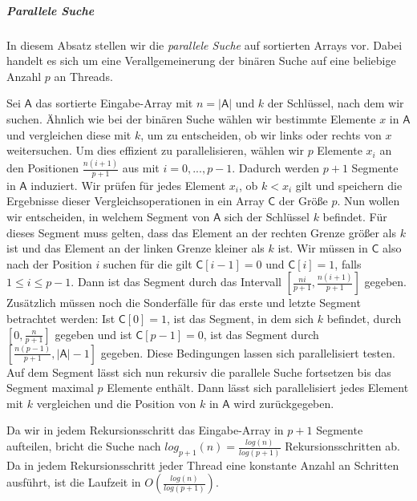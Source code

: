 \subparagraph*{Parallele Suche}
\label{dc3:parallel:suche}
In diesem Absatz stellen wir die \textit{parallele Suche} auf sortierten Arrays vor. \cite{merge:kruskal} Dabei handelt es sich um eine Verallgemeinerung der binären Suche auf eine beliebige Anzahl $p$ an Threads.

Sei $\mathsf{A}$ das sortierte Eingabe-Array mit $n = |\mathsf{A}|$ und $k$ der Schlüssel, nach dem wir suchen. Ähnlich wie bei der binären Suche wählen wir bestimmte Elemente $x$ in $\mathsf{A}$ und vergleichen diese mit $k$, um zu entscheiden, ob wir links oder rechts von $x$ weitersuchen. Um dies effizient zu parallelisieren, wählen wir $p$ Elemente $x_i$ an den Positionen $\frac{n(i+1)}{p+1}$ aus mit $i = 0,...,p-1$. Dadurch werden $p+1$ Segmente in $\mathsf{A}$ induziert. Wir prüfen für jedes Element $x_i$, ob $k < x_i$ gilt und speichern die Ergebnisse dieser Vergleichsoperationen in ein Array $\mathsf{C}$ der Größe $p$.
Nun wollen wir entscheiden, in welchem Segment von $\mathsf{A}$ sich der Schlüssel $k$ befindet. Für dieses Segment muss gelten, dass das Element an der rechten Grenze größer als $k$ ist und das Element an der linken Grenze kleiner als $k$ ist. Wir müssen in $\mathsf{C}$ also nach der Position $i$ suchen für die gilt $\mathsf{C}[i-1] = 0$ und $\mathsf{C}[i] = 1$, falls $1 \le i \le p-1$. Dann ist das Segment durch das Intervall $[\frac{ni}{p+1}, \frac{n(i+1)}{p+1}]$ gegeben. Zusätzlich müssen noch die Sonderfälle für das erste und letzte Segment betrachtet werden: Ist $\mathsf{C}[0] = 1$, ist das Segment, in dem sich $k$ befindet, durch $[0, \frac{n}{p+1}]$ gegeben und ist $\mathsf{C}[p-1] = 0$, ist das Segment durch $[\frac{n(p-1)}{p+1}, |\mathsf{A}|-1]$ gegeben. Diese Bedingungen lassen sich parallelisiert testen. 
Auf dem Segment lässt sich nun rekursiv die parallele Suche fortsetzen bis das Segment maximal $p$ Elemente enthält. Dann lässt sich parallelisiert jedes Element mit $k$ vergleichen und die Position von $k$ in $\mathsf{A}$ wird zurückgegeben.

Da wir in jedem Rekursionsschritt das Eingabe-Array in $p+1$ Segmente aufteilen, bricht die Suche nach $log_{p+1}(n) = \frac{log(n)}{log(p+1)}$ Rekursionsschritten ab. Da in jedem Rekursionsschritt jeder Thread eine konstante Anzahl an Schritten ausführt, ist die Laufzeit in $O(\frac{log(n)}{log(p+1)})$.
